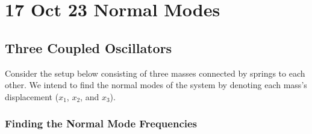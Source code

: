 \documentclass[letterpaper,10pt,english]{jupyterBook}
\begin{document}
\chapter{17 Oct 23 \sphinxhyphen{} Normal Modes}
\label{\detokenize{content/3_waves/normal_modes:oct-23-normal-modes}}\label{\detokenize{content/3_waves/normal_modes::doc}}

\section{Three Coupled Oscillators}
\label{\detokenize{content/3_waves/normal_modes:three-coupled-oscillators}}
\sphinxAtStartPar
Consider the setup below consisting of three masses connected by springs to each other. We intend to find the normal modes of the system by denoting each mass’s displacement (\(x_1\), \(x_2\), and \(x_3\)).




\subsection{Finding the Normal Mode Frequencies}
\label{\detokenize{content/3_waves/normal_modes:finding-the-normal-mode-frequencies}}
\sphinxAtStartPar
{}
\end{document}
